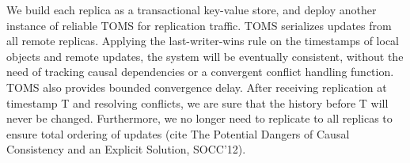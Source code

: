 We build each replica as a transactional key-value store, and deploy another instance of reliable TOMS for replication traffic. TOMS serializes updates from all remote replicas. Applying the last-writer-wins rule on the timestamps of local objects and remote updates, the system will be eventually consistent, without the need of tracking causal dependencies or a convergent conflict handling function. TOMS also provides bounded convergence delay. After receiving replication at timestamp T and resolving conflicts, we are sure that the history before T will never be changed. Furthermore, we no longer need to replicate to all replicas to ensure total ordering of updates (cite The Potential Dangers of Causal Consistency and an Explicit Solution, SOCC'12).
